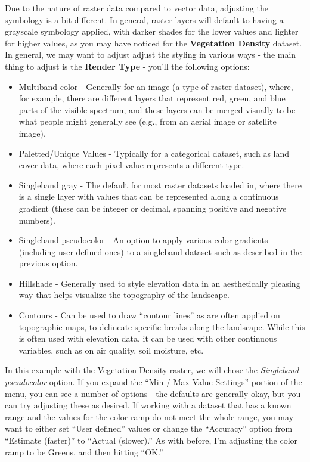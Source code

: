 \documentclass[
  letterpaper,
  DIV=11,
  numbers=noendperiod]{scrreprt}
\providecommand{\tightlist}{%
  \setlength{\itemsep}{0pt}\setlength{\parskip}{0pt}}\usepackage{longtable,booktabs,array}
\begin{document}
Due to the nature of raster data compared to vector data, adjusting the
symbology is a bit different. In general, raster layers will default to
having a grayscale symbology applied, with darker shades for the lower
values and lighter for higher values, as you may have noticed for the
\textbf{Vegetation Density} dataset. In general, we may want to adjust
adjust the styling in various ways - the main thing to adjust is the
\textbf{Render Type} - you'll the following options:

\begin{itemize}
\tightlist
\item
  Multiband color - Generally for an image (a type of raster dataset),
  where, for example, there are different layers that represent red,
  green, and blue parts of the visible spectrum, and these layers can be
  merged visually to be what people might generally see (e.g., from an
  aerial image or satellite image).
\item
  Paletted/Unique Values - Typically for a categorical dataset, such as
  land cover data, where each pixel value represents a different type.
\item
  Singleband gray - The default for most raster datasets loaded in,
  where there is a single layer with values that can be represented
  along a continuous gradient (these can be integer or decimal, spanning
  positive and negative numbers).
\item
  Singleband pseudocolor - An option to apply various color gradients
  (including user-defined ones) to a singleband dataset such as
  described in the previous option.
\item
  Hillshade - Generally used to style elevation data in an aesthetically
  pleasing way that helps visualize the topography of the landscape.
\item
  Contours - Can be used to draw ``contour lines'' as are often applied
  on topographic maps, to delineate specific breaks along the landscape.
  While this is often used with elevation data, it can be used with
  other continuous variables, such as on air quality, soil moisture,
  etc.
\end{itemize}

In this example with the Vegetation Density raster, we will chose the
\emph{Singleband pseudocolor} option. If you expand the ``Min / Max
Value Settings'' portion of the menu, you can see a number of options -
the defaults are generally okay, but you can try adjusting these as
desired. If working with a dataset that has a known range and the values
for the color ramp do not meet the whole range, you may want to either
set ``User defined'' values or change the ``Accuracy'' option from
``Estimate (faster)'' to ``Actual (slower).'' As with before, I'm
adjusting the color ramp to be Greens, and then hitting ``OK.''
\end{document}
